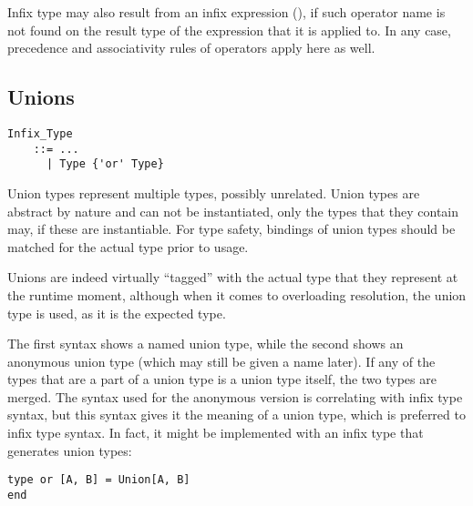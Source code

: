 Infix type may also result from an infix expression (), if such operator name is not found on the result type of the expression that it is applied to. In any case, precedence and associativity rules of operators apply here as well. 





\subsection{Unions}
\label{sec:unions}

\grammar\begin{lstlisting}
Infix_Type
    ::= ...
      | Type {'or' Type}
\end{lstlisting}

Union types represent multiple types, possibly unrelated. Union types are abstract by nature and can not be instantiated, only the types that they contain may, if these are instantiable. For type safety, bindings of union types should be matched for the actual type prior to usage. 

Unions are indeed virtually ``tagged'' with the actual type that they represent at the runtime moment, although when it comes to overloading resolution, the union type is used, as it is the expected type. 

The first syntax shows a named union type, while the second shows an anonymous union type (which may still be given a name later). If any of the types that are a part of a union type is a union type itself, the two types are merged. The syntax used for the anonymous version is correlating with infix type syntax, but this syntax gives it the meaning of a union type, which is preferred to infix type syntax. In fact, it might be implemented with an infix type that generates union types:

\begin{lstlisting}
type or [A, B] = Union[A, B] 
end
\end{lstlisting}

